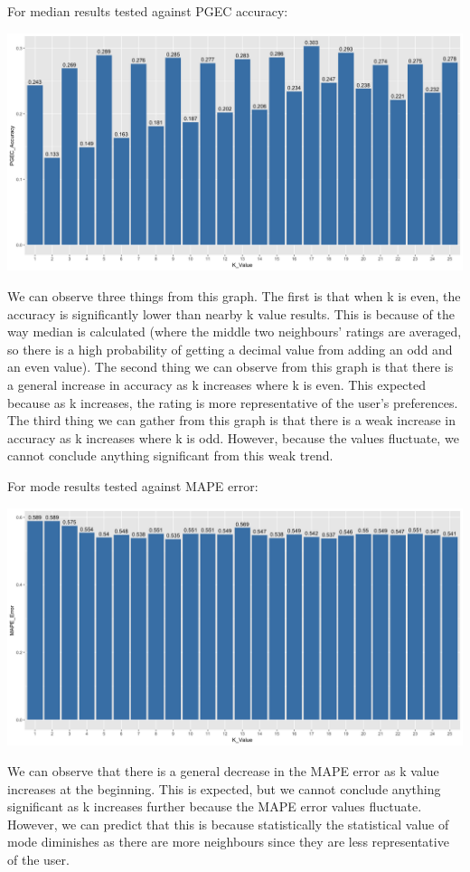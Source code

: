 \documentclass{article}
\begin{document}
For median results tested against PGEC accuracy:

\includegraphics[scale=0.25]{Median-PGEC.png}

We can observe three things from this graph. The first is that when k is even, the accuracy is significantly lower than nearby k value results. This is because of the way median is calculated (where the middle two neighbours' ratings are averaged, so there is a high probability of getting a decimal value from adding an odd and an even value). The second thing we can observe from this graph is that there is a general increase in accuracy as k increases where k is even. This expected because as k increases, the rating is more representative of the user's preferences. The third thing we can gather from this graph is that there is a weak increase in accuracy as k increases where k is odd. However, because the values fluctuate, we cannot conclude anything significant from this weak trend. 

For mode results tested against MAPE error:

\includegraphics[scale=0.25]{Vecmode-MAPE.png}

We can observe that there is a general decrease in the MAPE error as k value increases at the beginning. This is expected, but we cannot conclude anything significant as k increases further because the MAPE error values fluctuate. However, we can predict that this is because statistically the statistical value of mode diminishes as there are more neighbours since they are less representative of the user. 
\end{document}
